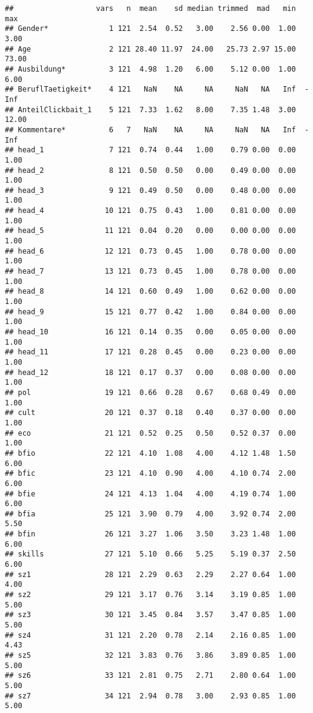 \documentclass[]{article}
\begin{document}
\begin{verbatim}
##                   vars   n  mean    sd median trimmed  mad   min   max
## Gender*              1 121  2.54  0.52   3.00    2.56 0.00  1.00  3.00
## Age                  2 121 28.40 11.97  24.00   25.73 2.97 15.00 73.00
## Ausbildung*          3 121  4.98  1.20   6.00    5.12 0.00  1.00  6.00
## BeruflTaetigkeit*    4 121   NaN    NA     NA     NaN   NA   Inf  -Inf
## AnteilClickbait_1    5 121  7.33  1.62   8.00    7.35 1.48  3.00 12.00
## Kommentare*          6   7   NaN    NA     NA     NaN   NA   Inf  -Inf
## head_1               7 121  0.74  0.44   1.00    0.79 0.00  0.00  1.00
## head_2               8 121  0.50  0.50   0.00    0.49 0.00  0.00  1.00
## head_3               9 121  0.49  0.50   0.00    0.48 0.00  0.00  1.00
## head_4              10 121  0.75  0.43   1.00    0.81 0.00  0.00  1.00
## head_5              11 121  0.04  0.20   0.00    0.00 0.00  0.00  1.00
## head_6              12 121  0.73  0.45   1.00    0.78 0.00  0.00  1.00
## head_7              13 121  0.73  0.45   1.00    0.78 0.00  0.00  1.00
## head_8              14 121  0.60  0.49   1.00    0.62 0.00  0.00  1.00
## head_9              15 121  0.77  0.42   1.00    0.84 0.00  0.00  1.00
## head_10             16 121  0.14  0.35   0.00    0.05 0.00  0.00  1.00
## head_11             17 121  0.28  0.45   0.00    0.23 0.00  0.00  1.00
## head_12             18 121  0.17  0.37   0.00    0.08 0.00  0.00  1.00
## pol                 19 121  0.66  0.28   0.67    0.68 0.49  0.00  1.00
## cult                20 121  0.37  0.18   0.40    0.37 0.00  0.00  1.00
## eco                 21 121  0.52  0.25   0.50    0.52 0.37  0.00  1.00
## bfio                22 121  4.10  1.08   4.00    4.12 1.48  1.50  6.00
## bfic                23 121  4.10  0.90   4.00    4.10 0.74  2.00  6.00
## bfie                24 121  4.13  1.04   4.00    4.19 0.74  1.00  6.00
## bfia                25 121  3.90  0.79   4.00    3.92 0.74  2.00  5.50
## bfin                26 121  3.27  1.06   3.50    3.23 1.48  1.00  6.00
## skills              27 121  5.10  0.66   5.25    5.19 0.37  2.50  6.00
## sz1                 28 121  2.29  0.63   2.29    2.27 0.64  1.00  4.00
## sz2                 29 121  3.17  0.76   3.14    3.19 0.85  1.00  5.00
## sz3                 30 121  3.45  0.84   3.57    3.47 0.85  1.00  5.00
## sz4                 31 121  2.20  0.78   2.14    2.16 0.85  1.00  4.43
## sz5                 32 121  3.83  0.76   3.86    3.89 0.85  1.00  5.00
## sz6                 33 121  2.81  0.75   2.71    2.80 0.64  1.00  5.00
## sz7                 34 121  2.94  0.78   3.00    2.93 0.85  1.00  5.00

\end{verbatim}
\end{document}
